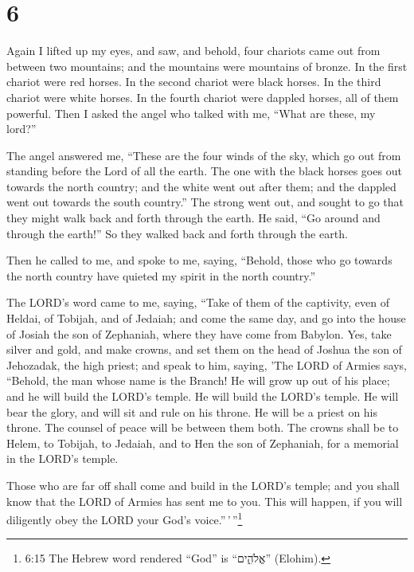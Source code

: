 \hypertarget{section-5}{%
\section{6}\label{section-5}}

 Again I lifted up my eyes, and saw, and behold, four
chariots came out from between two mountains; and the mountains were
mountains of bronze.  In the first chariot were red horses.
In the second chariot were black horses.  In the third
chariot were white horses. In the fourth chariot were dappled horses,
all of them powerful.  Then I asked the angel who talked
with me, ``What are these, my lord?''

 The angel answered me, ``These are the four winds of the
sky, which go out from standing before the Lord of all the earth.
 The one with the black horses goes out towards the north
country; and the white went out after them; and the dappled went out
towards the south country.''  The strong went out, and
sought to go that they might walk back and forth through the earth. He
said, ``Go around and through the earth!'' So they walked back and forth
through the earth.

 Then he called to me, and spoke to me, saying, ``Behold,
those who go towards the north country have quieted my spirit in the
north country.''

 The LORD's word came to me, saying,  ``Take of
them of the captivity, even of Heldai, of Tobijah, and of Jedaiah; and
come the same day, and go into the house of Josiah the son of Zephaniah,
where they have come from Babylon.  Yes, take silver and
gold, and make crowns, and set them on the head of Joshua the son of
Jehozadak, the high priest;  and speak to him, saying, 'The
LORD of Armies says, ``Behold, the man whose name is the Branch! He will
grow up out of his place; and he will build the LORD's temple.
 He will build the LORD's temple. He will bear the glory,
and will sit and rule on his throne. He will be a priest on his throne.
The counsel of peace will be between them both.  The crowns
shall be to Helem, to Tobijah, to Jedaiah, and to Hen the son of
Zephaniah, for a memorial in the LORD's temple.

 Those who are far off shall come and build in the LORD's
temple; and you shall know that the LORD of Armies has sent me to you.
This will happen, if you will diligently obey the LORD your God's
voice.''\,'\,''\footnote{6:15 The Hebrew word rendered ``God'' is
  ``אֱלֹהִ֑ים'' (Elohim).}

